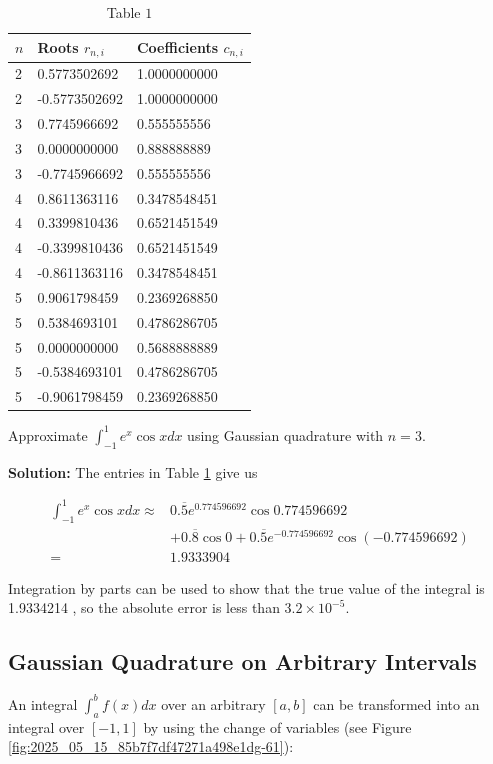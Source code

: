 \documentclass[12pt,a4paper]{article}
\begin{document}
\begin{table}[h]
\centering
\begin{tabular}{|l|l|l|}
\hline
$n$ & Roots $r_{n, i}$ & Coefficients $c_{n, i}$ \\
\hline
2 & 0.5773502692 & 1.0000000000 \\
\hline
2 & -0.5773502692 & 1.0000000000 \\
\hline
3 & 0.7745966692 & 0.555555556 \\
\hline
3 & 0.0000000000 & 0.888888889 \\
\hline
3 & -0.7745966692 & 0.555555556 \\
\hline
4 & 0.8611363116 & 0.3478548451 \\
\hline
4 & 0.3399810436 & 0.6521451549 \\
\hline
4 & -0.3399810436 & 0.6521451549 \\
\hline
4 & -0.8611363116 & 0.3478548451 \\
\hline
5 & 0.9061798459 & 0.2369268850 \\
\hline
5 & 0.5384693101 & 0.4786286705 \\
\hline
5 & 0.0000000000 & 0.5688888889 \\
\hline
5 & -0.5384693101 & 0.4786286705 \\
\hline
5 & -0.9061798459 & 0.2369268850 \\
\hline
\end{tabular}
\caption{\scriptsize Table $1$}
\label{legendpolytable1}
\end{table}

\begin{example}
Approximate $\int_{-1}^{1} e^{x} \cos x d x$ using Gaussian quadrature with $n=3$.


\textbf{Solution:}
The entries in Table \ref{legendpolytable1} give us

$$
\begin{aligned}
\int_{-1}^{1} e^{x} \cos x d x \approx & 0 . \overline{5} e^{0.774596692} \cos 0.774596692 \\
& +0 . \overline{8} \cos 0+0 . \overline{5} e^{-0.774596692} \cos (-0.774596692) \\
= & 1.9333904
\end{aligned}
$$

Integration by parts can be used to show that the true value of the integral is 1.9334214 , so the absolute error is less than $3.2 \times 10^{-5}$.
\end{example}

\subsection*{Gaussian Quadrature on Arbitrary Intervals}
An integral $\int_{a}^{b} f(x) d x$ over an arbitrary $[a, b]$ can be transformed into an integral over $[-1,1]$ by using the change of variables (see Figure \ref{fig:2025_05_15_85b7f7df47271a498e1dg-61}):
\end{document}
